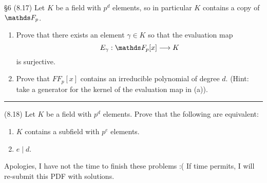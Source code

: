 \documentclass{homework}
\begin{document}
\begin{problem}{\S 6}
  (8.17) Let $K$ be a field with $p^d$ elements, so in particular $K$ contains a copy of $\F_p$.
  \begin{enumerate}[label=(\alph*)]
    \item Prove that there exists an element $\gamma\in K$ so that the evaluation map \[
          E_\gamma:\F_p[x]\longrightarrow K
      \] is surjective.
    \item Prove that $FF_p[x]$ contains an irreducible polynomial of degree $d$. (Hint: take a
      generator for the kernel of the evaluation map in (a)).
  \end{enumerate}
  \hrule\vspace{1ex}
  (8.18) Let $K$ be a field with $p^d$ elements. Prove that the following are equivalent:
  \begin{enumerate}[label=(\alph*)]
    \item $K$ contains a subfield with $p^e$ elements.
    \item $e\mid d$.
  \end{enumerate}
\end{problem}

\begin{solution}
  Apologies, I have not the time to finish these problems :( If time permits, I will re-submit this
  PDF with solutions.
\end{solution}
\end{document}
